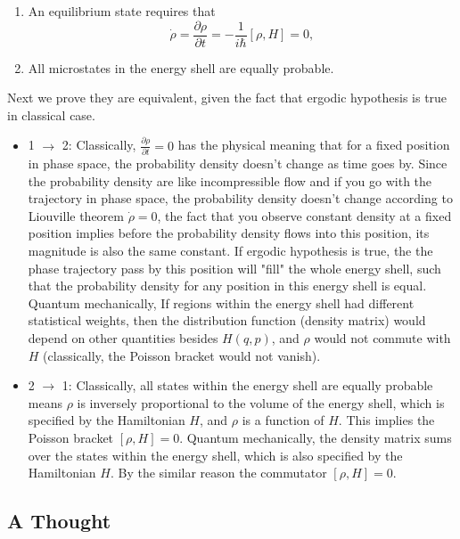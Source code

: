 \documentclass[10pt]{article}
\begin{document}
	\begin{enumerate}
		\item An equilibrium state requires that
			\begin{equation}
				\dot{\rho} = \frac{\partial \rho}{\partial t} = -\frac{1}{i \hbar}[\rho, H] = 0,
			\end{equation}
		\item All microstates in the energy shell are equally probable.
	\end{enumerate}

	Next we prove they are equivalent, given the fact that ergodic hypothesis is true in classical case.
	\begin{itemize}
		\item 1 $\to$ 2: Classically, $\frac{\partial \rho}{\partial t} = 0$ has the physical meaning that for a fixed position in phase space, the probability density doesn't change as time goes by. Since the probability density are like incompressible flow and if you go with the trajectory in phase space, the probability density doesn't change according to Liouville theorem $\dot{\rho} =0$, the fact that you observe constant density at a fixed position implies before the probability density flows into this position, its magnitude is also the same constant. If ergodic hypothesis is true, the the phase trajectory pass by this position will "fill" the whole energy shell, such that the probability density for any position in this energy shell is equal. Quantum mechanically, If regions within the energy shell had different statistical weights, then the distribution function (density matrix) would depend on other quantities besides $H(q,p)$, and $\rho$ would not commute with $H$ (classically, the Poisson bracket would not vanish).

		\item 2 $\to$ 1: Classically, all states within the energy shell are equally probable means $\rho$ is inversely proportional to the volume of the energy shell, which is specified by the Hamiltonian $H$, and $\rho$ is a function of $H$. This implies the Poisson bracket $[\rho, H] = 0$. Quantum mechanically, the density matrix sums over the states within the energy shell, which is also specified by the Hamiltonian $H$. By the similar reason the commutator $[\rho, H] = 0$.
	\end{itemize}

	\subsection{A Thought}
\end{document}
